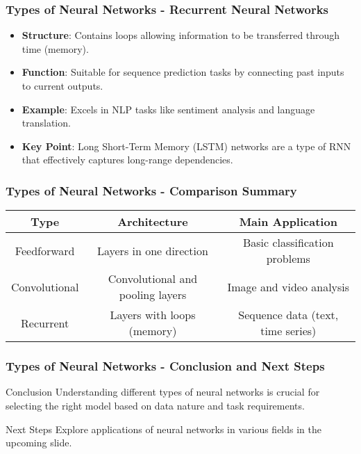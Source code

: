 \documentclass[aspectratio=169]{beamer}
\begin{document}
\begin{frame}[fragile]
    \frametitle{Types of Neural Networks - Recurrent Neural Networks}
    \begin{itemize}
        \item \textbf{Structure}: Contains loops allowing information to be transferred through time (memory).
        \item \textbf{Function}: Suitable for sequence prediction tasks by connecting past inputs to current outputs.
        \item \textbf{Example}: Excels in NLP tasks like sentiment analysis and language translation.
        \item \textbf{Key Point}: Long Short-Term Memory (LSTM) networks are a type of RNN that effectively captures long-range dependencies.
    \end{itemize}
\end{frame}

\begin{frame}[fragile]
    \frametitle{Types of Neural Networks - Comparison Summary}
    \begin{tabular}{|c|c|c|}
        \hline
        \textbf{Type} & \textbf{Architecture} & \textbf{Main Application} \\
        \hline
        Feedforward     & Layers in one direction  & Basic classification problems     \\
        \hline
        Convolutional   & Convolutional and pooling layers & Image and video analysis     \\
        \hline
        Recurrent       & Layers with loops (memory) & Sequence data (text, time series) \\
        \hline
    \end{tabular}
\end{frame}

\begin{frame}[fragile]
    \frametitle{Types of Neural Networks - Conclusion and Next Steps}
    \begin{block}{Conclusion}
        Understanding different types of neural networks is crucial for selecting the right model based on data nature and task requirements.
    \end{block}
    \begin{block}{Next Steps}
        Explore applications of neural networks in various fields in the upcoming slide.
    \end{block}
\end{frame}
\end{document}
